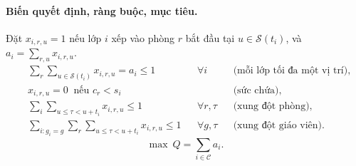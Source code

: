 \paragraph{Biến quyết định, ràng buộc, mục tiêu.} Đặt $x_{i,r,u}=1$ nếu lớp $i$
xếp vào phòng $r$ bắt đầu tại $u\in\mathcal{S}(t_i)$, và $a_i=\sum_{r,u}x_{i,r,u}$.
\begin{align}
  &\textstyle\sum_{r}\sum_{u\in\mathcal{S}(t_i)} x_{i,r,u} = a_i \le 1
     && \forall i &&\text{(mỗi lớp tối đa một vị trí)}, \label{eq:c1}\\
  &x_{i,r,u}=0 \ \text{ nếu } c_r < s_i && && \text{(sức chứa)}, \label{eq:c2}\\
  &\textstyle\sum_{i}\sum_{u\le\tau<u+t_i} x_{i,r,u} \le 1
     && \forall r,\tau &&\text{(xung đột phòng)}, \label{eq:c3}\\
  &\textstyle\sum_{i:g_i=g}\sum_{r}\sum_{u\le\tau<u+t_i} x_{i,r,u} \le 1
     && \forall g,\tau &&\text{(xung đột giáo viên)}. \label{eq:c4}
\end{align}
\begin{equation}
  \boxed{\ \max\ Q = \sum_{i\in\mathcal{C}} a_i.\ }
  \label{eq:obj}
\end{equation}
